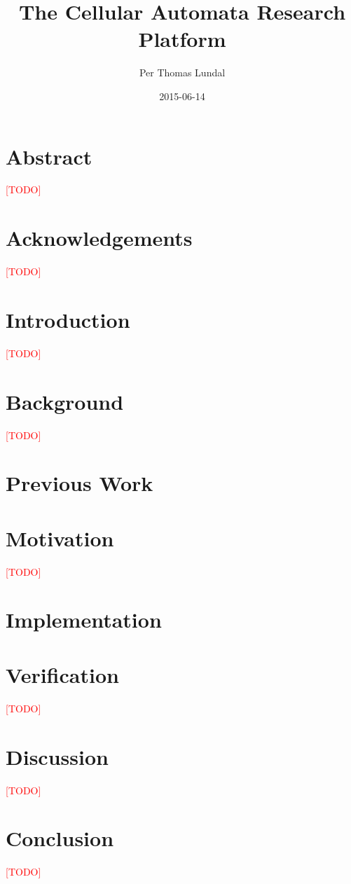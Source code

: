 \documentclass[a4paper]{report}
\title{
    {The Cellular Automata Research Platform}\\
    \TODO
}
\author{Per Thomas Lundal}
\date{2015-06-14}
\newcommand\TODO{\textcolor{red}{[TODO]}}
\begin{document}
\maketitle

\newpage
{}

\chapter*{Abstract}
    \TODO

\chapter*{Acknowledgements}
    \TODO

\tableofcontents

\newpage
{}

\chapter{Introduction}
    \label{ch:introduction}
    \TODO

\chapter{Background}
    \label{ch:background}
    \TODO

\chapter{Previous Work}
    \label{ch:previous-work}
    

\chapter{Motivation}
    \label{ch:motivation}
    \TODO

\chapter{Implementation}
    \label{ch:implementation}
    

\chapter{Verification}
    \label{ch:verification}
    \TODO

\chapter{Discussion}
    \label{ch:discussion}
    \TODO

\chapter{Conclusion}
    \label{ch:conclusion}
    \TODO



\end{document}
